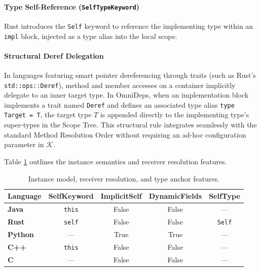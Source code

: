 \paragraph{Type Self-Reference (\texttt{SelfTypeKeyword})}
Rust introduces the \texttt{Self} keyword to reference the implementing type
within an \texttt{impl} block, injected as a type alias into the local scope.

\paragraph{Structural Deref Delegation}
In languages featuring smart pointer dereferencing through traits
(such as Rust's
\texttt{std::ops::Deref}), method and member accesses on a container implicitly
delegate to an inner target type. In OmniDeps, when an implementation block
implements a trait named \texttt{Deref} and defines an associated type alias
\texttt{type Target = T}, the target type $T$ is appended directly to
the implementing
type's super-types in the Scope Tree. This structural rule integrates seamlessly
with the standard Method Resolution Order without requiring an ad-hoc
configuration parameter in $\mathcal{K}$.

Table \ref{tab:lang_config_inst} outlines the instance semantics and
receiver resolution features.

\begin{table}[htbp]
  \centering
  \small
  \begin{tabular}{|l|c|c|c|c|}
    \hline
    \textbf{Language} & \textbf{SelfKeyword} & \textbf{ImplicitSelf}
    & \textbf{DynamicFields} & \textbf{SelfType} \\ \hline
    \textbf{Java}     & \texttt{this}        & False
    & False                  & ---
    \\ \hline
    \textbf{Rust}     & \texttt{self}        & False
    & False                  & \texttt{Self}
    \\ \hline
    \textbf{Python}   & ---                  & True
    & True                   & ---
    \\ \hline
    \textbf{C++}      & \texttt{this}        & False
    & False                  & ---
    \\ \hline
    \textbf{C}        & ---                  & False
    & False                  & ---
    \\ \hline
  \end{tabular}
  \caption{Instance model, receiver resolution, and type anchor features.}
  \label{tab:lang_config_inst}
\end{table}
